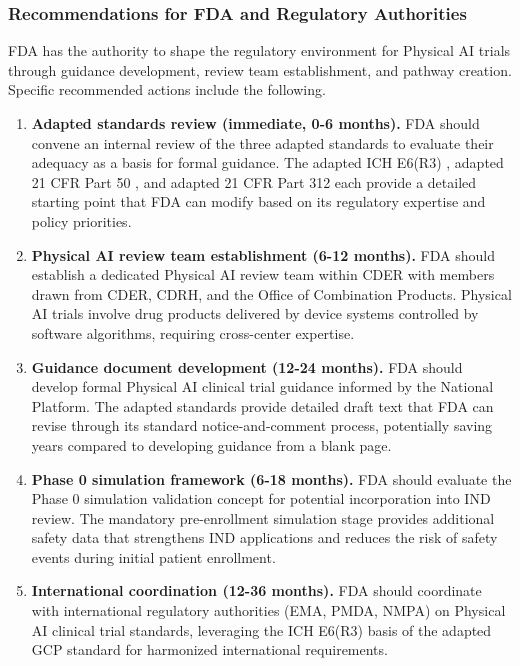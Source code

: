 \subsubsection{Recommendations for FDA and Regulatory Authorities}

FDA has the authority to shape the regulatory environment for Physical AI
trials through guidance development, review team establishment, and pathway
creation. Specific recommended actions include the following.

\begin{enumerate}[nosep]
  \item \textbf{Adapted standards review (immediate, 0-6 months).} FDA should
    convene an internal review of the three adapted standards to evaluate
    their adequacy as a basis for formal guidance. The adapted ICH E6(R3)
    \cite{ich-adapt}, adapted 21 CFR Part 50 \cite{cfr50-adapt}, and adapted
    21 CFR Part 312 \cite{cfr312-adapt} each provide a detailed starting
    point that FDA can modify based on its regulatory expertise and policy
    priorities.

  \item \textbf{Physical AI review team establishment (6-12 months).} FDA
    should establish a dedicated Physical AI review team within CDER with
    members drawn from CDER, CDRH, and the Office of Combination Products.
    Physical AI trials involve drug products delivered by device systems
    controlled by software algorithms, requiring cross-center expertise.

  \item \textbf{Guidance document development (12-24 months).} FDA should
    develop formal Physical AI clinical trial guidance informed by the
    National Platform. The adapted standards provide detailed draft text that
    FDA can revise through its standard notice-and-comment process, potentially
    saving years compared to developing guidance from a blank page.

  \item \textbf{Phase 0 simulation framework (6-18 months).} FDA should
    evaluate the Phase 0 simulation validation concept for potential
    incorporation into IND review. The mandatory pre-enrollment simulation
    stage provides additional safety data that strengthens IND applications
    and reduces the risk of safety events during initial patient enrollment.

  \item \textbf{International coordination (12-36 months).} FDA should
    coordinate with international regulatory authorities (EMA, PMDA, NMPA)
    on Physical AI clinical trial standards, leveraging the ICH E6(R3) basis
    of the adapted GCP standard for harmonized international requirements.
\end{enumerate}

